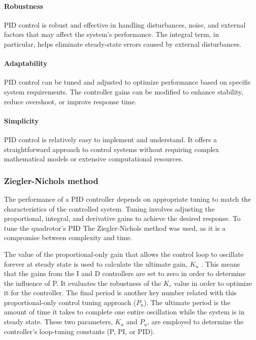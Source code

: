 \paragraph{Robustness}PID control is robust and effective in handling disturbances, noise, and external factors that may affect the system's performance. The integral term, in particular, helps eliminate steady-state errors caused by external disturbances. \cite{PIDbook}
\paragraph{Adaptability}PID control can be tuned and adjusted to optimize performance based on specific system requirements. The controller gains can be modified to enhance stability, reduce overshoot, or improve response time. \cite{PIDbook}
\paragraph{Simplicity}PID control is relatively easy to implement and understand. It offers a straightforward approach to control systems without requiring complex mathematical models or extensive computational resources. \cite{PIDbook}

\subsubsection{Ziegler-Nichols method}
The performance of a PID controller depends on appropriate tuning to match the characteristics of the controlled system. Tuning involves adjusting the proportional, integral, and derivative gains to achieve the desired response. 
To tune the quadrotor's PID The Ziegler-Nichols method was used, as it is a compromise between complexity and time. \cite{ZNPID}

The value of the proportional-only gain that allows the control loop to oscillate forever at steady state is used to calculate the ultimate gain, $K_u$ . This means that the gains from the I and D controllers are set to zero in order to determine the influence of P. It evaluates the robustness of the $K_c$ value in order to optimize it for the controller. The final period is another key number related with this proportional-only control tuning approach ($P_u$). The ultimate period is the amount of time it takes to complete one entire oscillation while the system is in steady state. These two parameters, $K_u$ and $P_u$, are employed to determine the controller's loop-tuning constants (P, PI, or PID). \cite{LibrePID}

